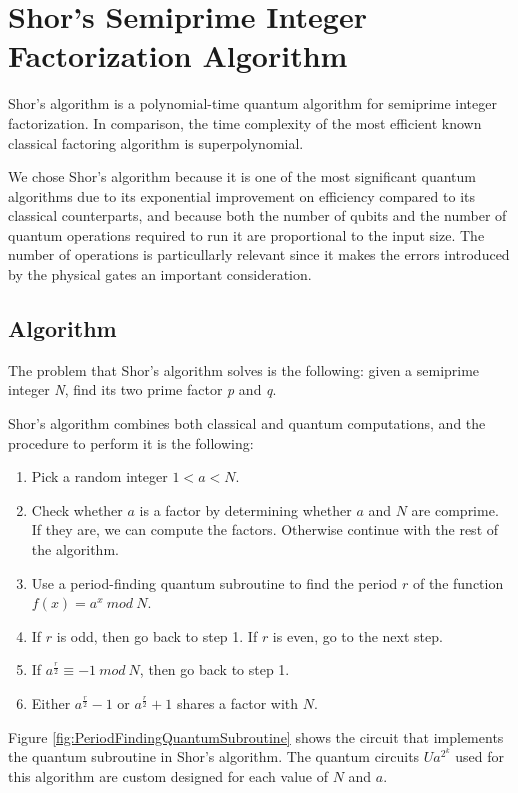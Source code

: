 %
%
\chapter {Shor's Semiprime Integer Factorization Algorithm}

Shor's algorithm is a polynomial-time quantum algorithm for semiprime integer factorization. In comparison, the time complexity of the most efficient known classical factoring algorithm is superpolynomial.

We chose Shor's algorithm because it is one of the most significant quantum algorithms due to its exponential improvement on efficiency compared to its classical counterparts, and because both the number of qubits and the number of quantum operations required to run it are proportional to the input size. The number of operations is particullarly relevant since it makes the errors introduced by the physical gates an important consideration.

\section{Algorithm}

The problem that Shor's algorithm solves is the following: given a semiprime integer \textit{N}, find its two prime factor \textit{p} and \textit{q}.

Shor's algorithm combines both classical and quantum computations, and the procedure to perform it is the following:
\begin{enumerate}
    \item Pick a random integer $1 < a < N$.
    \item Check whether $a$ is a factor by determining whether $a$ and $N$ are comprime. If they are, we can compute the factors. Otherwise continue with the rest of the algorithm.
    \item Use a period-finding quantum subroutine to find the period $r$ of the function $f(x)=a^{x} \ mod \ N$.
    \item If $r$ is odd, then go back to step 1. If $r$ is even, go to the next step.
    \item If $a^{\frac{r}{2}} \equiv -1  \ mod \ N$, then go back to step 1.
    \item Either $a^{\frac{r}{2}} - 1$ or $a^{\frac{r}{2}} + 1$ shares a factor with $N$.
\end{enumerate}

Figure \ref{fig:PeriodFindingQuantumSubroutine} shows the circuit that implements the quantum subroutine in Shor's algorithm. The quantum circuits $Ua^{2^k}$ used for this algorithm are custom designed for each value of $N$ and $a$.

